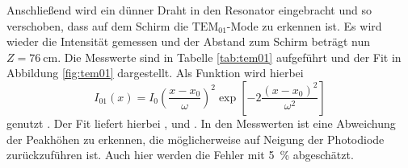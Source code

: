 Anschließend wird ein dünner Draht in den Resonator eingebracht und so verschoben, dass auf dem Schirm die $\text{TEM}_{01}$-Mode zu erkennen ist.
Es wird wieder die Intensität gemessen und der Abstand zum Schirm beträgt nun $Z = \SI{76}{\centi\meter}$.
Die Messwerte sind in Tabelle \ref{tab:tem01} aufgeführt und der Fit in Abbildung \ref{fig:tem01} dargestellt.
Als Funktion wird hierbei
\begin{equation}
    \label{eqn:tem01}
    I_{01}(x) = I_0 \left(\frac{x-x_0}{\omega}\right)^2 \exp \left[-2 \frac{\left(x-x_0\right)^2}{\omega^2}\right]
\end{equation}
genutzt \cite{Wiki_TEM}.
Der Fit liefert hierbei \unskip,  und \unskip.
In den Messwerten ist eine Abweichung der Peakhöhen zu erkennen, die möglicherweise auf Neigung der Photodiode zurückzuführen ist.
Auch hier werden die Fehler mit \SI{5}{\percent} abgeschätzt.
